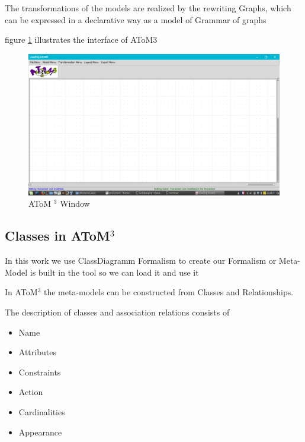  The transformations of the models are realized by the rewriting
Graphs, which can be expressed in a declarative way as a model of
Grammar of graphs

 figure \ref{fig:AToM3 Window} illustrates the interface of AToM3 

\begin{figure}[th]
	\centering
		\includegraphics{Chapiter3/img/atom3}
	\caption{\label{fig:AToM3 Window}AToM $^{3}$ Window}
\end{figure} 
\subsection{Classes in AToM$^{3}$ }
In this work we use ClassDiagramm Formalism to create  our Formalism 
or Meta-Model is built in the tool so we can load it and use  it
 
In AToM$^{3}$ the meta-models can be constructed from Classes and
Relationships.

The description of classes and association relations consists of

\begin{itemize}
\item  Name
\item  Attributes
\item  Constraints
\item  Action
\item  Cardinalities
\item  Appearance
\end{itemize}

